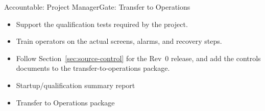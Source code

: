 \begin{stagecard}{Accountable: Project Manager}{Gate: Transfer to Operations}
\begin{itemize}[leftmargin=*,itemsep=1pt,topsep=2pt]
  \item Support the qualification tests required by the project.
  \item Train operators on the actual screens, alarms, and recovery steps.
  \item Follow Section~\ref{sec:source-control} for the Rev~0 release, and add the controls documents to the transfer-to-operations package.
\end{itemize}
\tcbline
{}\par
\begin{itemize}[leftmargin=*,itemsep=1pt,topsep=2pt]
  \item Startup/qualification summary report
  \item Transfer to Operations package
\end{itemize}
\tcbline
{}
\end{stagecard}

